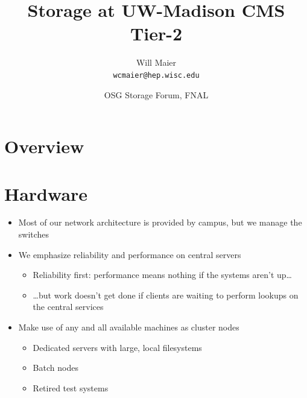 \documentclass{beamer}
\title{Storage at UW-Madison CMS Tier-2}
\author[Maier]{
    Will Maier \\ 
    {\tt wcmaier@hep.wisc.edu}}
\institute[Wisconsin]{University of Wisconsin - High Energy Physics}
\date[2009.06.30]{OSG Storage Forum, FNAL}
\begin{document}

\begin{frame}
    \titlepage
\end{frame}

\section{Overview}
\begin{frame}
    \tableofcontents
\end{frame}

\section{Hardware}
\begin{frame}
\begin{itemize}
	\item Most of our network architecture is provided by campus, but we manage the switches
	\item We emphasize reliability and performance on central servers
	\begin{itemize}
		\item Reliability first: performance means nothing if the systems aren't up\ldots{}
		\item \ldots{}but work doesn't get done if clients are waiting to perform lookups on the central services
	\end{itemize}
	\item Make use of any and all available machines as cluster nodes
	\begin{itemize}
		\item Dedicated servers with large, local filesystems
		\item Batch nodes
		\item Retired test systems
	\end{itemize}
\end{itemize}
\end{frame}
\end{document}
